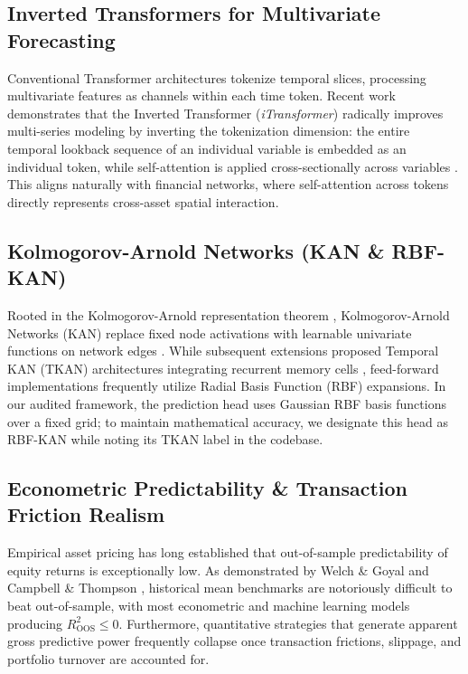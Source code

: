 \documentclass[10pt,twocolumn,a4paper]{article}
\begin{document}
\subsection{Inverted Transformers for Multivariate Forecasting}
Conventional Transformer architectures tokenize temporal slices, processing multivariate features as channels within each time token. Recent work demonstrates that the Inverted Transformer (\textit{iTransformer}) radically improves multi-series modeling by inverting the tokenization dimension: the entire temporal lookback sequence of an individual variable is embedded as an individual token, while self-attention is applied cross-sectionally across variables \cite{liu2024itransformer}. This aligns naturally with financial networks, where self-attention across tokens directly represents cross-asset spatial interaction.

\subsection{Kolmogorov-Arnold Networks (KAN \& RBF-KAN)}
Rooted in the Kolmogorov-Arnold representation theorem \cite{kolmogorov1957}, Kolmogorov-Arnold Networks (KAN) replace fixed node activations with learnable univariate functions on network edges \cite{liu2025kan}. While subsequent extensions proposed Temporal KAN (TKAN) architectures integrating recurrent memory cells \cite{genet2024tkan}, feed-forward implementations frequently utilize Radial Basis Function (RBF) expansions. In our audited framework, the prediction head uses Gaussian RBF basis functions over a fixed grid; to maintain mathematical accuracy, we designate this head as RBF-KAN while noting its TKAN label in the codebase.

\subsection{Econometric Predictability \& Transaction Friction Realism}
Empirical asset pricing has long established that out-of-sample predictability of equity returns is exceptionally low. As demonstrated by Welch \& Goyal \cite{welch2008} and Campbell \& Thompson \cite{campbell2008}, historical mean benchmarks are notoriously difficult to beat out-of-sample, with most econometric and machine learning models producing $R^2_{\mathrm{OOS}} \le 0$. Furthermore, quantitative strategies that generate apparent gross predictive power frequently collapse once transaction frictions, slippage, and portfolio turnover are accounted for.
\end{document}
